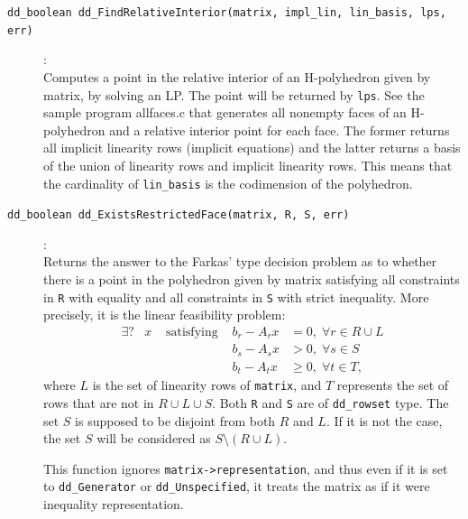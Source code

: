 \documentclass[11pt]{article}
\newcommand {\0} {{\bf 0}}
\begin{document}
\begin{description}
\item[{\tt dd\_boolean dd\_FindRelativeInterior(matrix, impl\_lin, lin\_basis, lps, err)}]:\\
Computes a point in the relative interior of an H-polyhedron given by matrix, by solving
an LP. The point will be returned by {\tt lps}.
See the sample program allfaces.c that generates all nonempty faces of an H-polyhedron and
a relative interior point for each face.   The former returns all implicit linearity rows (implicit equations)
and the latter returns a basis of the union of linearity rows and implicit linearity rows.
This means that the cardinality of {\tt *lin\_basis} is the codimension of the polyhedron.


\item[{\tt dd\_boolean dd\_ExistsRestrictedFace(matrix, R, S, err)}]:\\
Returns the answer to the Farkas' type decision problem as to whether there is a point
in the polyhedron given by matrix satisfying all constraints in {\tt R} with
equality and all constraints in {\tt S} with strict inequality.  More precisely,
it is the linear feasibility problem:
\[
\begin{array}{llllll}
\exists\mbox{?} &x  &\mbox{ satisfying } & b_r - A_r x  &= 0, \; \forall r \in R\cup L \\
                &   &                    & b_s - A_s x  &> 0, \; \forall s \in S \\
                &   &                    & b_t - A_t x  &\ge 0, \; \forall t \in T,
\end{array}
\]
where $L$ is the set of linearity rows of {\tt matrix}, and $T$ represents
the set of rows that are not in $R\cup L \cup S$.
Both {\tt R} and {\tt S} are of {\tt dd\_rowset} type.  The set $S$ is
supposed to be disjoint from both $R$ and $L$.
If it is not the case, the set $S$ will be considered as $S \setminus (R \cup L)$.

This function ignores {\tt matrix->representation}, and thus even if it is
set to {\tt dd\_Generator} or {\tt dd\_Unspecified}, it treats the matrix
as if it were inequality representation.


\end{description}
\end{document}
